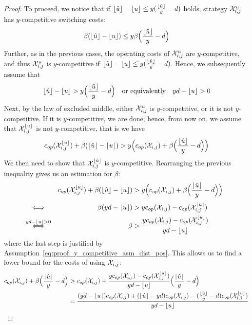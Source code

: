 \begin{proof}
To proceed, we notice that if $\lfloor\hat{u}\rfloor-\lfloor u\rfloor\le y(\frac{\lfloor\hat{u}\rfloor}{y}-d)$ holds, strategy $\mathcal{X}_{i,j}^u$ has $y$-competitive switching costs:
\begin{equation*}
	\beta(\lfloor\hat{u}\rfloor-\lfloor u\rfloor)\le y\beta\Bigl(\frac{\lfloor\hat{u}\rfloor}{y}-d\Bigr)
\end{equation*}
Further, as in the previous cases, the operating costs of $\mathcal{X}_{i,j}^u$ are $y$-competitive, and thus $\mathcal{X}_{i,j}^u$ is $y$-competitive if $\lfloor\hat{u}\rfloor-\lfloor u\rfloor\le y(\frac{\lfloor\hat{u}\rfloor}{y}-d)$. Hence, we subsequently assume that 
\begin{align}\label{eq:proof_y_competitive_asm_dist_pos}
	\lfloor\hat{u}\rfloor-\lfloor u\rfloor>y\Bigl(\frac{\lfloor\hat{u}\rfloor}{y}-d\Bigr)&&\text{or equivalently}&&yd-\lfloor u\rfloor>0
\end{align}
Next, by the law of excluded middle, either $\mathcal{X}_{i,j}^u$ is $y$-competitive, or it is not $y$-competitive. If it is $y$-competitive, we are done; hence, from now on, we assume that $\mathcal{X}_{i,j}^{\lfloor u\rfloor}$ is not $y$-competitive, that is we have 
\begin{equation*}
	c_{op}(\mathcal{X}_{i,j}^{\lfloor u\rfloor})+\beta(\lfloor\hat{u}\rfloor-\lfloor u\rfloor)>y\Bigl(c_{op}(\mathcal{X}_{i,j})+\beta\Bigl(\frac{\lfloor\hat{u}\rfloor}{y}-d\Bigr)\Bigr)
\end{equation*}
We then need to show that $\mathcal{X}_{i,j}^{\lfloor\hat{u}\rfloor}$ is $y$-competitive.
Rearranging the previous inequality gives us an estimation for $\beta$:
\begin{align*}
	&&\opcosts(\mx_{i,j}^{\floor{u}})+\beta(\floor{\hat{u}}-\floor{u})&>y\Bigl(\opcosts(\mx_{i,j})+\beta\Bigl(\frac{\floor{\hat{u}}}{y}-d\Bigr)\Bigr)
&\\
	&\stackrel{\phantom{yd-\floor{u}>0}}{\iff}&\beta(yd-\floor{u})&>y\opcosts(\mx_{i,j})-\opcosts(\mx_{i,j}^{\floor{u}})&\\
	&\stackrel{yd-\floor{u}>0}{\iff}&\beta&>\frac{y\opcosts(\mx_{i,j})-\opcosts(\mx_{i,j}^{\floor{u}})}{yd-\floor{u}}
\end{align*}
where the last step is justified by Assumption~\eqref{eq:proof_y_competitive_asm_dist_pos}.
This allows us to find a lower bound for the costs of using $\mathcal{X}_{i,j}$:
\begin{align*}
	\opcosts(\mx_{i,j})+\beta\Bigl(\frac{\floor{\hat{u}}}{y}-d\Bigr)&>\opcosts(\mx_{i,j})+\frac{y\opcosts(\mx_{i,j})-\opcosts(\mx_{i,j}^{\floor{u}})}{yd-\floor{u}}\Bigl(\frac{\floor{\hat{u}}}{y}-d\Bigr)\\
	&=\frac{(yd-\floor{u})\opcosts(\mx_{i,j})+(\floor{\hat{u}}-yd)\opcosts(\mx_{i,j})-(\frac{\floor{\hat{u}}}{y}-d)\opcosts(\mx_{i,j}^{\floor{u}})}{yd-\floor{u}}\\

\end{align*}
\end{proof}
